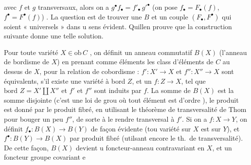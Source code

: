 \documentclass[11pt,a4paper]{article}
\begin{document}

avec $f$ et $g$ transversaux, alors on a $g^{\bullet} f_{\bullet} =
f'_{\bullet}\, g'^{\bullet}$ (on pose $f_{\bullet} = F_{\bullet}(f)$,
$f^{\bullet} = F^{\bullet}(f)$) . La question est de trouver une $B$ et un
couple $(F_{\bullet}, F^{\bullet})$ qui soient « universels » dans u
sens évident. Quillen prouve que la construction suivante donne une telle
solution.

Pour toute variété $X \in \mathrm{ob}\, C$ , on définit un anneau commutatif
$B(X)$ (l'anneau de bordisme de $X$) en prenant comme éléments les
class d'éléments de $C$ au dessus de $X$, pour la relation de
cobordisme : $f' : X' \to X$ et $f'' : X'' \to X$ sont équivalents, s'il
existe une variété à bord $Z$, et un $f : Z \to X$, tel que
$\text{bord } Z = X' \amalg X''$ et $f'$ et $f''$ sont induits par $f$. La
somme de $B(X)$ est la somme disjointe (c'est une loi de grou où tout
élément est d'ordre ), le produit est donné par le produit fibré, en
utilisant le théorème de transversalité de Thom pour bouger un peu $f''$, de
sorte à le rendre transversal à $f'$.
Si on a $f : X \to Y$, on définit $f_{\bullet} : B(X) \to B(Y)$ de façon
évidente (tou variété sur $X$ est sur $Y$), et
$f^{\bullet} : B(Y) \to B(X)$ par produit fibré (utilsant encore le
th.\ de transversalité). De cette façon, $B(X)$ devient u
foncteur-anneau  contravariant en $X$, et un foncteur
groupe covariant e
\end{document}
